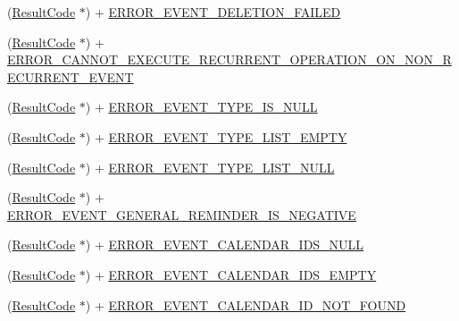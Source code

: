 \begin{DoxyCompactItemize}
\item 
(\hyperlink{interface_result_code}{Result\+Code} $\ast$) + \hyperlink{interface_result_code_af438fc85f2db1507a250779fe4157314}{E\+R\+R\+O\+R\+\_\+\+E\+V\+E\+N\+T\+\_\+\+D\+E\+L\+E\+T\+I\+O\+N\+\_\+\+F\+A\+I\+L\+E\+D}
\item 
(\hyperlink{interface_result_code}{Result\+Code} $\ast$) + \hyperlink{interface_result_code_ae27761a3a0541934f686ca6fde3b78f8}{E\+R\+R\+O\+R\+\_\+\+C\+A\+N\+N\+O\+T\+\_\+\+E\+X\+E\+C\+U\+T\+E\+\_\+\+R\+E\+C\+U\+R\+R\+E\+N\+T\+\_\+\+O\+P\+E\+R\+A\+T\+I\+O\+N\+\_\+\+O\+N\+\_\+\+N\+O\+N\+\_\+\+R\+E\+C\+U\+R\+R\+E\+N\+T\+\_\+\+E\+V\+E\+N\+T}
\item 
(\hyperlink{interface_result_code}{Result\+Code} $\ast$) + \hyperlink{interface_result_code_af8a784a22555d7ff26a0363be280b8db}{E\+R\+R\+O\+R\+\_\+\+E\+V\+E\+N\+T\+\_\+\+T\+Y\+P\+E\+\_\+\+I\+S\+\_\+\+N\+U\+L\+L}
\item 
(\hyperlink{interface_result_code}{Result\+Code} $\ast$) + \hyperlink{interface_result_code_a965db83f45a6aed864d51cc3fdc3d210}{E\+R\+R\+O\+R\+\_\+\+E\+V\+E\+N\+T\+\_\+\+T\+Y\+P\+E\+\_\+\+L\+I\+S\+T\+\_\+\+E\+M\+P\+T\+Y}
\item 
(\hyperlink{interface_result_code}{Result\+Code} $\ast$) + \hyperlink{interface_result_code_adbd7207737544215a701adebbedae55a}{E\+R\+R\+O\+R\+\_\+\+E\+V\+E\+N\+T\+\_\+\+T\+Y\+P\+E\+\_\+\+L\+I\+S\+T\+\_\+\+N\+U\+L\+L}
\item 
(\hyperlink{interface_result_code}{Result\+Code} $\ast$) + \hyperlink{interface_result_code_afb89301347b3c9318ba3ae39991a39de}{E\+R\+R\+O\+R\+\_\+\+E\+V\+E\+N\+T\+\_\+\+G\+E\+N\+E\+R\+A\+L\+\_\+\+R\+E\+M\+I\+N\+D\+E\+R\+\_\+\+I\+S\+\_\+\+N\+E\+G\+A\+T\+I\+V\+E}
\item 
(\hyperlink{interface_result_code}{Result\+Code} $\ast$) + \hyperlink{interface_result_code_a97ba82297664dc674e921666ac166488}{E\+R\+R\+O\+R\+\_\+\+E\+V\+E\+N\+T\+\_\+\+C\+A\+L\+E\+N\+D\+A\+R\+\_\+\+I\+D\+S\+\_\+\+N\+U\+L\+L}
\item 
(\hyperlink{interface_result_code}{Result\+Code} $\ast$) + \hyperlink{interface_result_code_a4e47939dcd29d755c6b03851aca1d852}{E\+R\+R\+O\+R\+\_\+\+E\+V\+E\+N\+T\+\_\+\+C\+A\+L\+E\+N\+D\+A\+R\+\_\+\+I\+D\+S\+\_\+\+E\+M\+P\+T\+Y}
\item 
(\hyperlink{interface_result_code}{Result\+Code} $\ast$) + \hyperlink{interface_result_code_a4902fe7d2ab33ed00fd840ce8773a238}{E\+R\+R\+O\+R\+\_\+\+E\+V\+E\+N\+T\+\_\+\+C\+A\+L\+E\+N\+D\+A\+R\+\_\+\+I\+D\+\_\+\+N\+O\+T\+\_\+\+F\+O\+U\+N\+D}
\item 

\end{DoxyCompactItemize}
